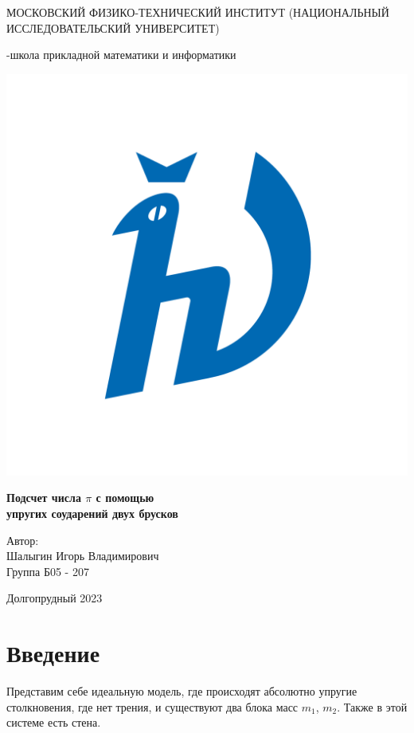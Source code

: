 \documentclass[a4paper,12pt]{article} %
\begin{document}
\pagestyle{empty}
\begin{titlepage}
\begin{center}
    {\large МОСКОВСКИЙ ФИЗИКО-ТЕХНИЧЕСКИЙ ИНСТИТУТ (НАЦИОНАЛЬНЫЙ ИССЛЕДОВАТЕЛЬСКИЙ УНИВЕРСИТЕТ)}
\end{center}
\begin{center}
    {-школа прикладной математики и информатики}
\end{center}


    \vspace{3.5cm}

\begin{center}
    \includegraphics[width=0.4\linewidth]{hv_full.png}
\end{center}
\vspace{0.1cm}
{\huge
\begin{center}
    {\bf Подсчет числа $\pi$ с помощью \\ упругих соударений двух брусков}
\end{center}
}
\vspace{2cm}
\begin{flushright}
{\LARGE Автор:\\ Шалыгин Игорь Владимирович \\
\vspace{0.2cm}
Группа Б05 - 207}
\end{flushright}
\vspace{3.5cm}
\begin{center}
    Долгопрудный 2023
\end{center}
\end{titlepage}
\newpage
\pagestyle{plain}


\section*{Введение}
Представим себе идеальную модель, где происходят абсолютно упругие столкновения, где нет трения, и существуют два блока масс $m_1$, $m_2$. Также в этой системе есть стена.
\end{document}
